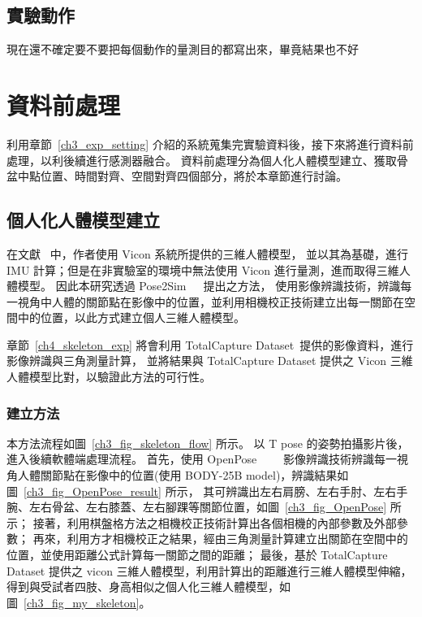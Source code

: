 \subsection{實驗動作}
現在還不確定要不要把每個動作的量測目的都寫出來，畢竟結果也不好

\section{資料前處理}
利用章節~\ref{ch3_exp_setting} 介紹的系統蒐集完實驗資料後，接下來將進行資料前處理，以利後續進行感測器融合。
資料前處理分為個人化人體模型建立、獲取骨盆中點位置、時間對齊、空間對齊四個部分，將於本章節進行討論。

\subsection{個人化人體模型建立}\label{ch3_skeleton_method}
在文獻~\cite{zhang2020fusing} 中，作者使用 Vicon 系統所提供的三維人體模型，
並以其為基礎，進行 IMU 計算；但是在非實驗室的環境中無法使用 Vicon 進行量測，進而取得三維人體模型。
因此本研究透過 Pose2Sim~\cite{Pagnon_2021_Robustness}~\cite{Pagnon_2022_Accuracy}~\cite{Pagnon_2022_JOSS}提出之方法，
使用影像辨識技術，辨識每一視角中人體的關節點在影像中的位置，並利用相機校正技術建立出每一關節在空間中的位置，以此方式建立個人三維人體模型。

章節~\ref{ch4_skeleton_exp} 將會利用 TotalCapture Dataset~\cite{Trumble:BMVC:2017}提供的影像資料，進行影像辨識與三角測量計算，
並將結果與 TotalCapture Dataset 提供之 Vicon 三維人體模型比對，以驗證此方法的可行性。

\subsubsection{建立方法}
本方法流程如圖~\ref{ch3_fig_skeleton_flow} 所示。
以 T pose 的姿勢拍攝影片後，進入後續軟體端處理流程。
首先，使用 OpenPose~\cite{8765346}~\cite{wei2016cpm}~\cite{simon2017hand}~\cite{cao2017realtime}
影像辨識技術辨識每一視角人體關節點在影像中的位置(使用 BODY-25B model)，辨識結果如圖~\ref{ch3_fig_OpenPose_result} 所示，
其可辨識出左右肩膀、左右手肘、左右手腕、左右骨盆、左右膝蓋、左右腳踝等關節位置，如圖~\ref{ch3_fig_OpenPose} 所示；
接著，利用棋盤格方法之相機校正技術計算出各個相機的內部參數及外部參數；
再來，利用方才相機校正之結果，經由三角測量計算建立出關節在空間中的位置，並使用距離公式計算每一關節之間的距離；
最後，基於 TotalCapture Dataset 提供之 vicon 三維人體模型，利用計算出的距離進行三維人體模型伸縮，
得到與受試者四肢、身高相似之個人化三維人體模型，如圖~\ref{ch3_fig_my_skeleton}。

